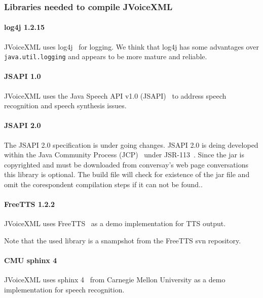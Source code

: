 \documentclass[11pt,a4paper]{article}
\begin{document}
\subsubsection{Libraries needed to compile JVoiceXML}
\label{sec:libr-need-comp}

\paragraph{log4j 1.2.15}

JVoiceXML uses log4j~\cite{apache:log4j} for logging. We think that log4j has 
some advantages
over \texttt{java.util.logging} and appears to be more mature and reliable.

\paragraph{JSAPI 1.0}

JVoiceXML uses the Java Speech API v1.0 (JSAPI)~\cite{sun:jsapi} to address 
speech recognition and speech synthesis issues.

\paragraph{JSAPI 2.0}

The JSAPI 2.0 specification is under going changes.
JSAPI 2.0 is deing developed within
the Java Community Process (JCP)~\cite{jcp} under 
JSR-113~\cite{jcp:jsr113}. Since the jar is copyrighted and must be downloaded
from conversay's web page conversations~\cite{conversay:jsr113}
this library is optional. The
build file will check for existence of the jar file and omit the corespondent compilation
steps if it can not be found..

\paragraph{FreeTTS 1.2.2}

JVoiceXML uses FreeTTS~\cite{freetts} as a demo implementation for TTS output.

Note that the used library is a snampshot from the FreeTTS svn repository.

\paragraph{CMU sphinx 4}

JVoiceXML uses sphinx 4~\cite{sphinx} from Carnegie Mellon University
as a demo implementation for speech recognition.
\end{document}
